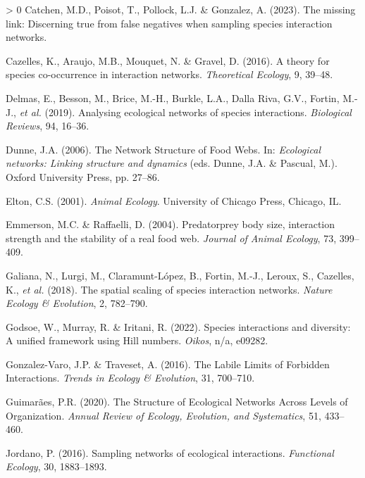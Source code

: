 \documentclass[10pt,oneside]{article}
\newlength{\cslhangindent}
\newenvironment{CSLReferences}[3] %
 {%
  \setlength{\parindent}{0pt}
  \ifodd #1 \everypar{\setlength{\hangindent}{\cslhangindent}}\ignorespaces\fi
  \ifnum #2 > 0
  \setlength{\parskip}{#2\baselineskip}
  \fi
 }%
 {}
\begin{document}
\begin{CSLReferences}{1}{0}
\leavevmode\hypertarget{ref-Catchen2023Missinga}{}%
Catchen, M.D., Poisot, T., Pollock, L.J. \& Gonzalez, A. (2023). The
missing link: Discerning true from false negatives when sampling species
interaction networks.

\leavevmode\hypertarget{ref-Cazelles2016Theorya}{}%
Cazelles, K., Araujo, M.B., Mouquet, N. \& Gravel, D. (2016). A theory
for species co-occurrence in interaction networks. \emph{Theoretical
Ecology}, 9, 39--48.

\leavevmode\hypertarget{ref-Delmas2019Analysing}{}%
Delmas, E., Besson, M., Brice, M.-H., Burkle, L.A., Dalla Riva, G.V.,
Fortin, M.-J., \emph{et al.} (2019). Analysing ecological networks of
species interactions. \emph{Biological Reviews}, 94, 16--36.

\leavevmode\hypertarget{ref-Dunne2006Network}{}%
Dunne, J.A. (2006). The Network Structure of Food Webs. In:
\emph{Ecological networks: Linking structure and dynamics} (eds. Dunne,
J.A. \& Pascual, M.). Oxford University Press, pp. 27--86.

\leavevmode\hypertarget{ref-Elton2001Animal}{}%
Elton, C.S. (2001). \emph{Animal Ecology}. University of Chicago Press,
Chicago, IL.

\leavevmode\hypertarget{ref-Emmerson2004PrePre}{}%
Emmerson, M.C. \& Raffaelli, D. (2004). Predatorprey body size,
interaction strength and the stability of a real food web. \emph{Journal
of Animal Ecology}, 73, 399--409.

\leavevmode\hypertarget{ref-Galiana2018SpaSca}{}%
Galiana, N., Lurgi, M., Claramunt-López, B., Fortin, M.-J., Leroux, S.,
Cazelles, K., \emph{et al.} (2018). The spatial scaling of species
interaction networks. \emph{Nature Ecology \& Evolution}, 2, 782--790.

\leavevmode\hypertarget{ref-Godsoe2022Species}{}%
Godsoe, W., Murray, R. \& Iritani, R. (2022). Species interactions and
diversity: A unified framework using Hill numbers. \emph{Oikos}, n/a,
e09282.

\leavevmode\hypertarget{ref-Gonzalez-Varo2016Labilea}{}%
Gonzalez-Varo, J.P. \& Traveset, A. (2016). The Labile Limits of
Forbidden Interactions. \emph{Trends in Ecology \& Evolution}, 31,
700--710.

\leavevmode\hypertarget{ref-Guimaraes2020Structurea}{}%
Guimarães, P.R. (2020). The Structure of Ecological Networks Across
Levels of Organization. \emph{Annual Review of Ecology, Evolution, and
Systematics}, 51, 433--460.

\leavevmode\hypertarget{ref-Jordano2016SamNet}{}%
Jordano, P. (2016). Sampling networks of ecological interactions.
\emph{Functional Ecology}, 30, 1883--1893.


\end{CSLReferences}
\end{document}
